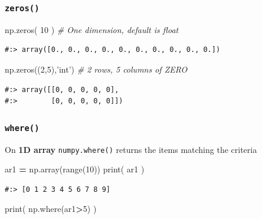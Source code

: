 \documentclass[
]{book}
\newenvironment{Shaded}{\begin{snugshade}}{\end{snugshade}}
\newcommand{\BuiltInTok}[1]{#1}
\newcommand{\CommentTok}[1]{\textcolor[rgb]{0.37,0.37,0.37}{\textit{#1}}}
\newcommand{\DecValTok}[1]{\textcolor[rgb]{0.06,0.06,0.06}{#1}}
\newcommand{\NormalTok}[1]{#1}
\newcommand{\OperatorTok}[1]{\textcolor[rgb]{0.43,0.43,0.43}{\textbf{#1}}}
\newcommand{\StringTok}[1]{\textcolor[rgb]{0.5,0.5,0.5}{#1}}
\begin{document}
\hypertarget{zeros}{%
\subsubsection{\texorpdfstring{\texttt{zeros()}}{zeros()}}\label{zeros}}

\begin{Shaded}
\begin{Highlighting}[]
\NormalTok{np.zeros( }\DecValTok{10}\NormalTok{ )    }\CommentTok{# One dimension, default is float}
\end{Highlighting}
\end{Shaded}

\begin{verbatim}
#:> array([0., 0., 0., 0., 0., 0., 0., 0., 0., 0.])
\end{verbatim}

\begin{Shaded}
\begin{Highlighting}[]
\NormalTok{np.zeros((}\DecValTok{2}\NormalTok{,}\DecValTok{5}\NormalTok{),}\StringTok{'int'}\NormalTok{)   }\CommentTok{# 2 rows, 5 columns of ZERO}
\end{Highlighting}
\end{Shaded}

\begin{verbatim}
#:> array([[0, 0, 0, 0, 0],
#:>        [0, 0, 0, 0, 0]])
\end{verbatim}

\hypertarget{where}{%
\subsubsection{\texorpdfstring{\texttt{where()}}{where()}}\label{where}}

On \textbf{1D array} \texttt{numpy.where()} returns the items matching the criteria

\begin{Shaded}
\begin{Highlighting}[]
\NormalTok{ar1 }\OperatorTok{=}\NormalTok{ np.array(}\BuiltInTok{range}\NormalTok{(}\DecValTok{10}\NormalTok{))}
\BuiltInTok{print}\NormalTok{( ar1 )}
\end{Highlighting}
\end{Shaded}

\begin{verbatim}
#:> [0 1 2 3 4 5 6 7 8 9]
\end{verbatim}

\begin{Shaded}
\begin{Highlighting}[]
\BuiltInTok{print}\NormalTok{( np.where(ar1}\OperatorTok{>}\DecValTok{5}\NormalTok{) )}
\end{Highlighting}
\end{Shaded}
\end{document}

